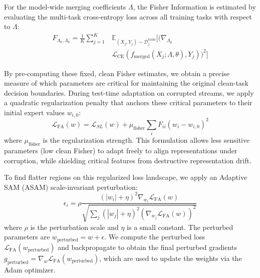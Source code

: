 \documentclass{article}
\theoremstyle{plain}
\theoremstyle{definition}
\theoremstyle{remark}
\begin{document}
For the model-wide merging coefficients $\Lambda$, the Fisher Information is estimated by evaluating the multi-task cross-entropy loss across all training tasks with respect to $\Lambda$:
\begin{equation}
\begin{split}
    F_{\Lambda_k, \Lambda_k} = \frac{1}{K} \sum_{j=1}^K & \mathbb{E}_{(X_j, Y_j) \sim \mathcal{D}_j^{\text{train}}} \Big[ \Big( \nabla_{\Lambda_k} \\
    & \mathcal{L}_{\text{CE}}(f_{\text{merged}}(X_j; \Lambda, \theta), Y_j) \Big)^2 \Big]
\end{split}
\end{equation}

By pre-computing these fixed, clean Fisher estimates, we obtain a precise measure of which parameters are critical for maintaining the original clean-task decision boundaries. During test-time adaptation on corrupted streams, we apply a quadratic regularization penalty that anchors these critical parameters to their initial expert values $w_{i,0}$:
\begin{equation}
    \mathcal{L}_{\text{FA}}(w) = \mathcal{L}_{SL}(w) + \mu_{\text{fisher}} \sum_i F_{ii} (w_i - w_{i,0})^2
\end{equation}
where $\mu_{\text{fisher}}$ is the regularization strength. This formulation allows less sensitive parameters (low clean Fisher) to adapt freely to align representations under corruption, while shielding critical features from destructive representation drift.

To find flatter regions on this regularized loss landscape, we apply an Adaptive SAM (ASAM) scale-invariant perturbation:
\begin{equation}
    \epsilon_i = \rho \frac{(|w_i| + \eta)^2 \nabla_{w_i} \mathcal{L}_{\text{FA}}(w)}{\sqrt{\sum_j (|w_j| + \eta)^2 (\nabla_{w_j} \mathcal{L}_{\text{FA}}(w))^2}}
\end{equation}
where $\rho$ is the perturbation scale and $\eta$ is a small constant. The perturbed parameters are $w_{\text{perturbed}} = w + \epsilon$. We compute the perturbed loss $\mathcal{L}_{\text{FA}}(w_{\text{perturbed}})$ and backpropagate to obtain the final perturbed gradients $g_{\text{perturbed}} = \nabla_w \mathcal{L}_{\text{FA}}(w_{\text{perturbed}})$, which are used to update the weights via the Adam optimizer.
\end{document}
